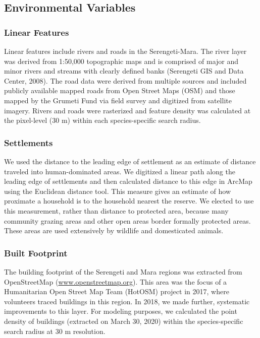 \documentclass[12pt,]{article}
\begin{document}
%




\subsection{Environmental Variables}
\subsubsection*{Linear Features}
Linear features include rivers and roads in the Serengeti-Mara. The river layer was derived from 1:50,000 topographic maps and is comprised of major and minor rivers and streams with clearly defined banks (Serengeti GIS and Data Center, 2008). The road data were derived from multiple sources and included publicly available mapped roads from Open Street Maps (OSM) and those mapped by the Grumeti Fund via field survey and digitized from satellite imagery. Rivers and roads were rasterized and feature density was calculated at the pixel-level (30 m) within each species-specific search radius.

\subsubsection*{Settlements}
We used the distance to the leading edge of settlement as an estimate of distance traveled into human-dominated areas. We digitized a linear path along the leading edge of settlements and then calculated distance to this edge in ArcMap using the Euclidean distance tool. This measure gives an estimate of how proximate a household is to the household nearest the reserve. We elected to use this measurement, rather than distance to protected area, because many community grazing areas and other open areas border formally protected areas. These areas are used extensively by wildlife and domesticated animals. 

\subsubsection*{Built Footprint}
The building footprint of the Serengeti and Mara regions was extracted from OpenStreetMap (\url{www.openstreetmap.org}). This area was the focus of a Humanitarian Open Street Map Team (HotOSM) project in 2017, where volunteers traced buildings in this region. In 2018, we made further, systematic improvements to this layer. For modeling purposes, we calculated the point density of buildings (extracted on March 30, 2020) within the species-specific search radius at 30 m resolution.
\end{document}
